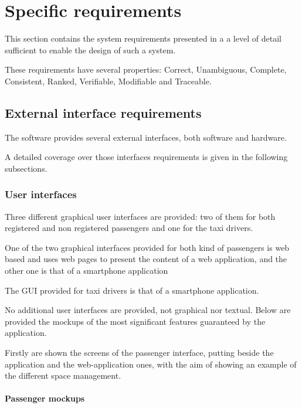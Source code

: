 \section{Specific requirements}
This section contains the system requirements presented in a a level of detail sufficient to enable the design of such a system.\par
These requirements have several properties: Correct, Unambiguous, Complete, Consistent, Ranked, Verifiable, Modifiable and Traceable.
\subsection{External interface requirements}
The software \myTaxiService{} provides several external interfaces, both software and hardware.\par
A detailed coverage over those interfaces requirements is given in the following subsections.
\subsubsection{User interfaces}
Three different graphical user interfaces are provided: two of them for both registered and non registered passengers and one for the taxi drivers.\par
One of the two graphical interfaces provided for both kind of passengers is web based and uses web pages to present the content of a web application, and the other one is that of a smartphone application\par
The GUI provided for taxi drivers is that of a smartphone application.\par
No additional user interfaces are provided, not graphical nor textual.
Below are provided the mockups of the  most significant features guaranteed by the application.\par
Firstly are shown the screens of the passenger interface, putting beside the application and the web-application ones, with the aim of showing an example of the different space management. \par 
\newpage
\paragraph{Passenger mockups}
\begin{itemize}
\end{itemize}
\newpage
